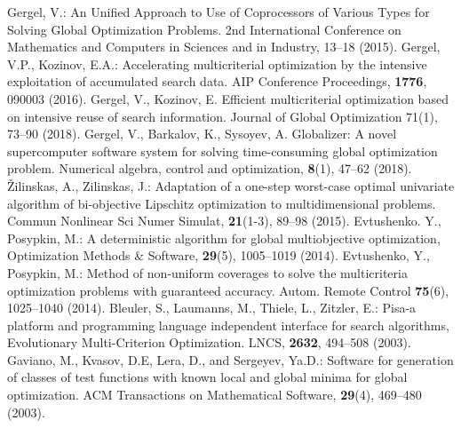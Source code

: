 \documentclass[runningheads]{llncs}
\begin{document}
\begin{thebibliography}{1}
 Gergel, V.: An Unified Approach to Use of Coprocessors of Various Types for Solving Global Optimization Problems. 2nd International Conference on Mathematics and Computers in Sciences and in Industry, 13--18 (2015). 
 Gergel, V.P., Kozinov, E.A.: Accelerating multicriterial optimization by the intensive exploitation of accumulated search data. AIP Conference Proceedings, \textbf{1776}, 090003 (2016). 
 Gergel, V., Kozinov, E. Efficient multicriterial optimization based on intensive reuse of search information. Journal of Global Optimization 71(1), 73--90 (2018).
 Gergel, V., Barkalov, K., Sysoyev, A. Globalizer: A novel supercomputer software system for solving time-consuming global optimization problem. Numerical algebra, control and optimization, \textbf{8}(1), 47--62 (2018).
 {\v Z}ilinskas, A., Zilinskas, J.: Adaptation of a one-step worst-case optimal univariate algorithm of bi-objective Lipschitz optimization to multidimensional problems. Commun Nonlinear Sci Numer Simulat, \textbf{21}(1-3), 89--98 (2015). 
 Evtushenko. Y., Posypkin, M.: A deterministic algorithm for global multiobjective optimization, Optimization Methods \& Software, \textbf{29}(5), 1005--1019 (2014). 
 Evtushenko, Y., Posypkin, M.: Method of non-uniform coverages to solve the multicriteria optimization problems with guaranteed accuracy. Autom. Remote Control \textbf{75}(6), 1025--1040 (2014).
 Bleuler, S., Laumanns, M., Thiele, L., Zitzler, E.: Pisa-a platform and programming language independent interface for search algorithms, Evolutionary Multi-Criterion Optimization. LNCS, \textbf{2632}, 494--508 (2003). 
 Gaviano, M., Kvasov, D.E, Lera, D., and Sergeyev, Ya.D.: Software for generation of classes of test functions with known local and global minima for global optimization. ACM Transactions on Mathematical Software, \textbf{29}(4), 469--480 (2003).
\end{thebibliography}


%
\end{document}
